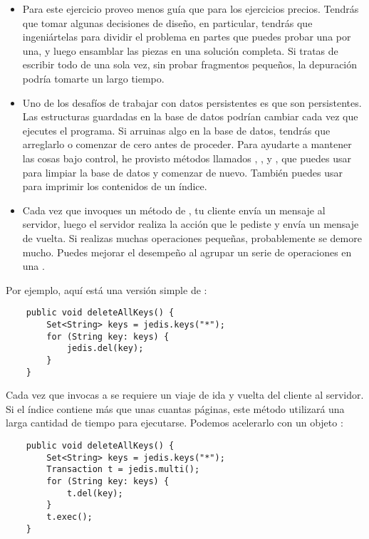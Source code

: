 \documentclass[12pt]{book}
\theoremstyle{exercise}
\begin{document}
\begin{itemize}

\item
  Para este ejercicio proveo menos guía que para los ejercicios
  precios. Tendrás que tomar algunas decisiones de diseño, en
  particular, tendrás que ingeniártelas para dividir el problema
  en partes que puedes probar una por una, y luego ensamblar las
  piezas en una solución completa. Si tratas de escribir todo de
  una sola vez, sin probar fragmentos pequeños, la depuración
  podría tomarte un largo tiempo.

\item
  Uno de los desafíos de trabajar con datos persistentes es que son
  persistentes. Las estructuras guardadas en la base de datos podrían
  cambiar cada vez que ejecutes el programa. Si arruinas algo en la base de
  datos, tendrás que arreglarlo o comenzar de cero antes de proceder. Para 
  ayudarte a mantener las cosas bajo control, he provisto métodos llamados
  , , y
  , que puedes usar para limpiar la base de datos y
  comenzar de nuevo. También puedes usar  para imprimir los
  contenidos de un índice.

\item
  Cada vez que invoques un método de , tu cliente envía un
  mensaje al servidor, luego el servidor realiza la acción que le pediste
  y envía un mensaje de vuelta. Si realizas muchas operaciones pequeñas,
  probablemente se demore mucho. Puedes mejorar el desempeño al agrupar
  un serie de operaciones en una .

\end{itemize}

Por ejemplo, aquí está una versión simple de :

\begin{verbatim}
    public void deleteAllKeys() {
        Set<String> keys = jedis.keys("*");
        for (String key: keys) {
            jedis.del(key);
        }
    }
\end{verbatim}

Cada vez que invocas a  se requiere un viaje de ida y vuelta del cliente
al servidor. Si el índice contiene más que unas cuantas páginas, este método
utilizará una larga cantidad de tiempo para ejecutarse. Podemos acelerarlo con
un objeto :


\begin{verbatim}
    public void deleteAllKeys() {
        Set<String> keys = jedis.keys("*");
        Transaction t = jedis.multi();
        for (String key: keys) {
            t.del(key);
        }
        t.exec();
    }
\end{verbatim}
\end{document}
